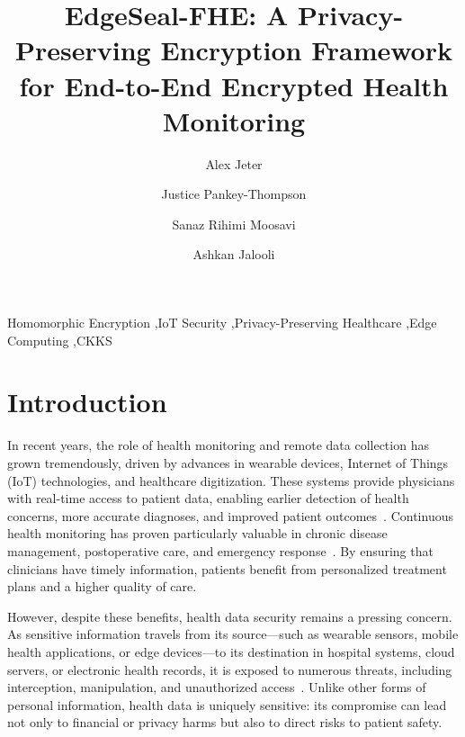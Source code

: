 \documentclass[review]{elsarticle}
\begin{document}
\title{EdgeSeal-FHE: A Privacy-Preserving Encryption Framework for End-to-End Encrypted Health Monitoring}

\author[csudh]{Alex Jeter}

\author[csudh]{Justice Pankey-Thompson}
\ead{[redacted]}

\author[csudh]{Sanaz Rihimi Moosavi}
\ead{[redacted]}

\author[csudh]{Ashkan Jalooli}
\ead{[redacted]}

\address[csudh]{Department of Computer Science, California State University Dominguez Hills, Carson, CA 90747, USA}

\begin{abstract}
\end{abstract}

\begin{keyword}
Homomorphic Encryption \sep IoT Security \sep Privacy-Preserving Healthcare \sep Edge Computing \sep CKKS
\end{keyword}

\maketitle

\section{Introduction}
In recent years, the role of health monitoring and remote data collection has grown tremendously, driven by advances in wearable devices, Internet of Things (IoT) technologies, and healthcare digitization. These systems provide physicians with real-time access to patient data, enabling earlier detection of health concerns, more accurate diagnoses, and improved patient outcomes~\cite{iqbal2021advances}. Continuous health monitoring has proven particularly valuable in chronic disease management, postoperative care, and emergency response~\cite{mohammed2019real}. By ensuring that clinicians have timely information, patients benefit from personalized treatment plans and a higher quality of care.

However, despite these benefits, health data security remains a pressing concern. As sensitive information travels from its source—such as wearable sensors, mobile health applications, or edge devices—to its destination in hospital systems, cloud servers, or electronic health records, it is exposed to numerous threats, including interception, manipulation, and unauthorized access~\cite{atadoga2024comparative}. Unlike other forms of personal information, health data is uniquely sensitive: its compromise can lead not only to financial or privacy harms but also to direct risks to patient safety.
\end{document}
